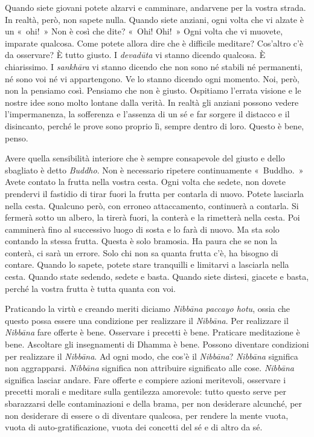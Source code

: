 Quando siete giovani potete alzarvi e camminare, andarvene per la vostra
strada. In realtà, però, non sapete nulla. Quando siete anziani, ogni
volta che vi alzate è un «~ohi!~» Non è così che dite? «~Ohi! Ohi!~»
Ogni volta che vi muovete, imparate qualcosa. Come potete allora dire
che è difficile meditare? Cos'altro c'è da osservare? È tutto giusto. I
\emph{devadūta} vi stanno dicendo qualcosa. È chiarissimo. I
\emph{sankhāra} vi stanno dicendo che non sono né stabili né permanenti,
né sono voi né vi appartengono. Ve lo stanno dicendo ogni momento. Noi,
però, non la pensiamo così. Pensiamo che non è giusto. Ospitiamo
l'errata visione e le nostre idee sono molto lontane dalla verità. In
realtà gli anziani possono vedere l'impermanenza, la sofferenza e
l'assenza di un sé e far sorgere il distacco e il disincanto, perché le
prove sono proprio lì, sempre dentro di loro. Questo è bene, penso.

Avere quella sensibilità interiore che è sempre consapevole del giusto e
dello sbagliato è detto \emph{Buddho}. Non è necessario ripetere
continuamente «~Buddho.~» Avete contato la frutta nella vostra cesta.
Ogni volta che sedete, non dovete prendervi il fastidio di tirar fuori
la frutta per contarla di nuovo. Potete lasciarla nella cesta. Qualcuno
però, con erroneo attaccamento, continuerà a contarla. Si fermerà sotto
un albero, la tirerà fuori, la conterà e la rimetterà nella cesta. Poi
camminerà fino al successivo luogo di sosta e lo farà di nuovo. Ma sta
solo contando la stessa frutta. Questa è solo bramosia. Ha paura che se
non la conterà, ci sarà un errore. Solo chi non sa quanta frutta c'è, ha
bisogno di contare. Quando lo sapete, potete stare tranquilli e
limitarvi a lasciarla nella cesta. Quando state sedendo, sedete e basta.
Quando siete distesi, giacete e basta, perché la vostra frutta è tutta
quanta con voi.

Praticando la virtù e creando meriti diciamo \emph{Nibbāna paccayo
hotu}, ossia che questo possa essere una condizione per realizzare il
\emph{Nibbāna}. Per realizzare il \emph{Nibbāna} fare offerte è bene.
Osservare i precetti è bene. Praticare meditazione è bene. Ascoltare gli
insegnamenti di Dhamma è bene. Possono diventare condizioni per
realizzare il \emph{Nibbāna}. Ad ogni modo, che cos'è il \emph{Nibbāna}?
\emph{Nibbāna} significa non aggrapparsi. \emph{Nibbāna} significa non
attribuire significato alle cose. \emph{Nibbāna} significa lasciar
andare. Fare offerte e compiere azioni meritevoli, osservare i precetti
morali e meditare sulla gentilezza amorevole: tutto questo serve per
sbarazzarsi delle contaminazioni e della brama, per non desiderare
alcunché, per non desiderare di essere o di diventare qualcosa, per
rendere la mente vuota, vuota di auto-gratificazione, vuota dei concetti
del sé e di altro da sé.

